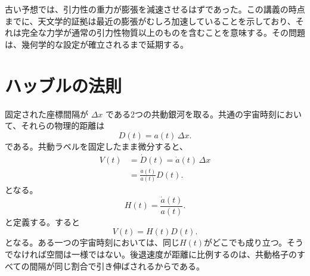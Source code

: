 \begin{classroomqa}
\end{classroomqa}

\begin{classroomqa}
\end{classroomqa}

古い予想では、引力性の重力が膨張を減速させるはずであった。この講義の時点までに、天文学的証拠は最近の膨張がむしろ加速していることを示しており、それは完全な力学が通常の引力性物質以上のものを含むことを意味する。その問題は、幾何学的な設定が確立されるまで延期する。

\section{ハッブルの法則}

固定された座標間隔が
\(\Delta x\)
である2つの共動銀河を取る。共通の宇宙時刻において、それらの物理的距離は
\begin{equation}
  D(t)=a(t)\,\Delta x.
  \label{eq:physical-distance}
\end{equation}
である。共動ラベルを固定したまま微分すると、
\begin{align}
  V(t)
    &=\dot D(t)
      =\dot a(t)\,\Delta x \nonumber\\
    &=\frac{\dot a(t)}{a(t)}D(t).
  \label{eq:hubble-derivation}
\end{align}
となる。
\begin{equation}
  H(t)=\frac{\dot a(t)}{a(t)}.
  \label{eq:hubble-parameter}
\end{equation}
と定義する。すると
\begin{equation}
  V(t)=H(t)D(t).
  \label{eq:hubble-law}
\end{equation}
となる。ある一つの宇宙時刻においては、同じ\(H(t)\)がどこでも成り立つ。そうでなければ空間は一様ではない。後退速度が距離に比例するのは、共動格子のすべての間隔が同じ割合で引き伸ばされるからである。

